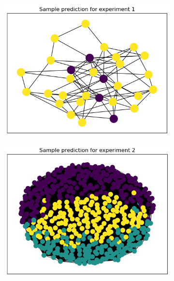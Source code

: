 \documentclass[switch, 12pt]{article}
\begin{document}
\begin{figure}[h]
    \hfill
    \centering
    \begin{subfigure}{0.28\linewidth}
        \centering
        \includegraphics[width=\linewidth]{figures/exp1_pred.png}
    \end{subfigure}
    \hfill
    \begin{subfigure}{0.28\linewidth}
        \centering
        \includegraphics[width=\linewidth]{figures/exp2_pred.png}
    \end{subfigure}
    \hfill
    \begin{subfigure}{0.28\linewidth}
        \centering

\end{subfigure}
\end{figure}
\end{document}
